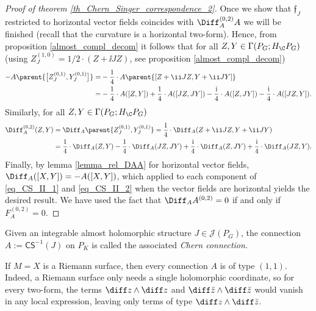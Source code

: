 \begin{proof}[\textit{Proof of theorem} \ref{th_Chern_Singer_correspondence_2}]
    Once we show that \(\mathfrak{f}_J\) restricted to horizontal vector fields coincides with \(\Diff_A^{(0,2)}A\) we will be finished (recall that the curvature is a horizontal two-form). Hence, from proposition \ref{almost_compl_decom} it follows that for all \(Z,Y \in \Gamma(P_G; H_\C P_G)\) (using \(Z^{(1,0)}_J=1/2\cdot (Z+\ii JZ)\), see proposition \ref{almost_compl_decom})
    \begin{equation} \label{eq_CS_II_1}
        \begin{split}
        -A\parent{\big[Z_J^{(0,1)}, Y_J^{(0,1)}\big]}  =& -\frac{1}{4}\cdot A\parent{[Z+\ii J Z, Y+\ii J Y ]} \\ 
        = & -\frac{1}{4}\cdot A([Z,Y])+\frac{1}{4}\cdot A([JZ,JY]) - \frac{\mathrm{i}}{4}\cdot A([Z,JY]) - \frac{\mathrm{i}}{4} \cdot A([JZ, Y]).
        \end{split}
    \end{equation}
    Similarly, for all \(Z, Y \in \Gamma(P_G; H_\C P_G)\)
    \begin{equation} \label{eq_CS_II_2}
        \begin{split}
        \Diff_A^{(0,2)}(Z,Y) & = \Diff_A\parent{Z_J^{(0,1)}, Y_J^{(0,1)}}= \frac{1}{4}\cdot \Diff_A(Z+\ii J Z,Y+\ii JY) \\
        & = \frac{1}{4} \cdot \Diff_A(Z,Y)-\frac{1}{4} \cdot \Diff_A(JZ, JY) +\frac{\mathrm{i}}{4}\cdot \Diff_A(Z, JY) + \frac{\mathrm{i}}{4}\cdot \Diff_A(JZ, Y).
        \end{split}
    \end{equation}
    Finally, by lemma \ref{lemma_rel_DAA} for horizontal vector fields, \(\Diff_A([X,Y])=-A([X,Y])\), which applied to each component of \eqref{eq_CS_II_1} and \eqref{eq_CS_II_2} when the vector fields are horizontal yields the desired result. We have used the fact that \(\Diff_AA^{(0,2)}=0\) if and only if \(F_A^{(0,2)}=0\). 
\end{proof}

Given an integrable almost holomorphic structure \(J \in \mathscr{J}(P_G)\), the connection \(A:=\mathsf{CS}^{-1}(J)\) on \(P_K\) is called the associated \textit{Chern connection}. 

\begin{obs}
    If \(M=X\) is a Riemann surface, then every connection \(A\) is of type \((1,1)\). Indeed, a Riemann surface only needs a single holomorphic coordinate, so for every two-form, the terms \(\diff z \wedge \diff z\) and \(\diff \bar{z}\wedge \diff \bar{z}\) would vanish in any local expression, leaving only terms of type \(\diff z \wedge \diff \bar{z}\).
\end{obs}

